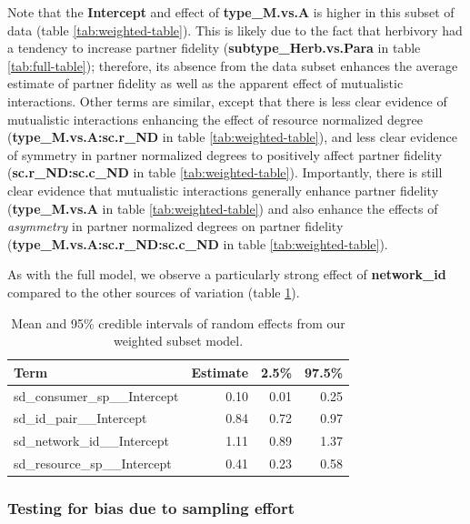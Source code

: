 \documentclass[11pt,]{article}
\begin{document}
Note that the \textbf{Intercept} and effect of \textbf{type\_M.vs.A} is
higher in this subset of data (table \ref{tab:weighted-table}). This is
likely due to the fact that herbivory had a tendency to increase partner
fidelity (\textbf{subtype\_Herb.vs.Para} in table \ref{tab:full-table});
therefore, its absence from the data subset enhances the average
estimate of partner fidelity as well as the apparent effect of
mutualistic interactions. Other terms are similar, except that there is
less clear evidence of mutualistic interactions enhancing the effect of
resource normalized degree (\textbf{type\_M.vs.A:sc.r\_ND} in table
\ref{tab:weighted-table}), and less clear evidence of symmetry in
partner normalized degrees to positively affect partner fidelity
(\textbf{sc.r\_ND:sc.c\_ND} in table \ref{tab:weighted-table}).
Importantly, there is still clear evidence that mutualistic interactions
generally enhance partner fidelity (\textbf{type\_M.vs.A} in table
\ref{tab:weighted-table}) and also enhance the effects of
\emph{asymmetry} in partner normalized degrees on partner fidelity
(\textbf{type\_M.vs.A:sc.r\_ND:sc.c\_ND} in table
\ref{tab:weighted-table}).

As with the full model, we observe a particularly strong effect of
\textbf{network\_id} compared to the other sources of variation (table
\ref{tab:weighted-table-random}).

\begin{table}[!h]

\caption{\label{tab:weighted-table-random}Mean and 95\% credible intervals of random effects from our weighted subset model.}
\centering
\begin{tabular}{lrrr}
\toprule
Term & Estimate & 2.5\% & 97.5\%\\
\midrule
\rowcolor{gray!6}  sd\_consumer\_sp\_\_Intercept & 0.10 & 0.01 & 0.25\\
sd\_id\_pair\_\_Intercept & 0.84 & 0.72 & 0.97\\
\rowcolor{gray!6}  sd\_network\_id\_\_Intercept & 1.11 & 0.89 & 1.37\\
sd\_resource\_sp\_\_Intercept & 0.41 & 0.23 & 0.58\\
\bottomrule
\end{tabular}
\end{table}

\subsubsection{Testing for bias due to sampling
effort}\label{testing-for-bias-due-to-sampling-effort}
\end{document}
